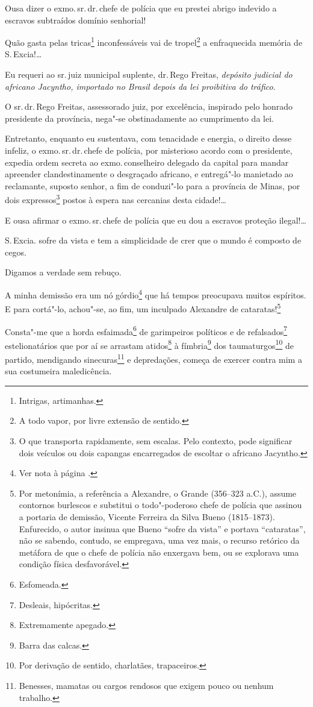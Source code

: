 Ousa dizer o exmo.\,sr.\,dr.\,chefe de polícia que eu prestei abrigo
indevido a escravos subtraídos domínio senhorial!

Quão gasta pelas tricas\footnote{Intrigas, artimanhas.} inconfessáveis
vai de tropel\footnote{A todo vapor, por livre extensão de sentido.} a
enfraquecida memória de S.\,Excia!\ldots{}

Eu requeri ao sr.\,juiz municipal suplente, dr.\,Rego Freitas,
\emph{depósito judicial do africano Jacyntho, importado no Brasil depois
da lei proibitiva do tráfico}.

O sr.\,dr.\,Rego Freitas, assessorado juiz, por excelência, inspirado pelo
honrado presidente da província, nega"-se obstinadamente ao cumprimento
da lei.

Entretanto, enquanto eu sustentava, com tenacidade e energia, o direito
desse infeliz, o exmo.\,sr.\,dr.\,chefe de polícia, por misterioso acordo
com o presidente, expedia ordem secreta ao exmo.\,conselheiro delegado da
capital para mandar apreender clandestinamente o desgraçado africano, e
entregá"-lo manietado ao reclamante, suposto senhor, a fim de conduzi"-lo
para a província de Minas, por dois expressos\footnote{O que
  transporta rapidamente, sem escalas. Pelo contexto, pode significar
  dois veículos ou dois capangas encarregados de escoltar o africano
  Jacyntho.} postos à espera nas cercanias desta cidade!\ldots{}

E ousa afirmar o exmo.\,sr.\,chefe de polícia que eu dou a escravos
proteção ilegal!\ldots{}

S.\,Excia. sofre da vista e tem a simplicidade de crer que o mundo é
composto de cegos.

Digamos a verdade sem rebuço.

A minha demissão era um nó górdio\footnote{Ver nota à página \pageref{gordio}.} que há tempos preocupava muitos
espíritos. E para cortá"-lo, achou"-se, ao fim, um inculpado Alexandre de
cataratas!\footnote{Por metonímia, a referência a Alexandre, o Grande
  (356--323 a.C.), assume contornos burlescos e substitui o todo"-poderoso
  chefe de polícia que assinou a portaria de demissão, Vicente Ferreira
  da Silva Bueno (1815--1873). Enfurecido, o autor insinua que Bueno
  ``sofre da vista'' e portava ``cataratas'', não se sabendo, contudo, se
  empregava, uma vez mais, o recurso retórico da metáfora de que o chefe
  de polícia não enxergava bem, ou se explorava uma condição física
  desfavorável.}

Consta"-me que a horda esfaimada\footnote{Esfomeada.} de garimpeiros
políticos e de refalsados\footnote{Desleais, hipócritas.}
estelionatários que por aí se arrastam atidos\footnote{Extremamente
  apegado.} à fímbria\footnote{Barra das calcas.} dos
taumaturgos\footnote{Por derivação de sentido, charlatães,
  trapaceiros.} de partido, mendigando sinecuras\footnote{Benesses,
  mamatas ou cargos rendosos que exigem pouco ou nenhum trabalho.} e
depredações, começa de exercer contra mim a sua costumeira maledicência.

